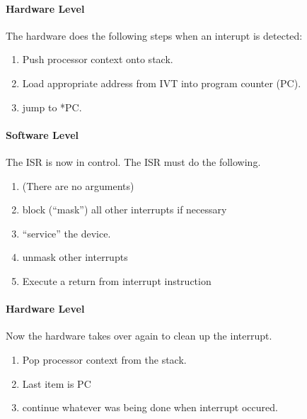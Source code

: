 \paragraph{Hardware Level}

 The hardware does the following steps when an interupt	%
is detected:	%

\begin{enumerate}
        \item Push processor context onto stack.
        \item Load appropriate address from IVT into
        program counter (PC).
        \item jump to *PC.
\end{enumerate}

\paragraph{Software Level}

 The ISR is now in control.  The ISR must do the	%
 following.	%

\begin{enumerate}
        \item (There are no arguments)
        \item block (``mask'') all other interrupts if necessary
        \item ``service'' the device.
        \item unmask other interrupts
        \item  Execute a return from interrupt instruction
\end{enumerate}

\paragraph{Hardware Level}

Now the hardware takes over again to clean up the interrupt.	%

\begin{enumerate}
        \item Pop processor context from the stack.
        \item Last item is PC
        \item continue whatever was being done when interrupt
        occured.
\end{enumerate}



